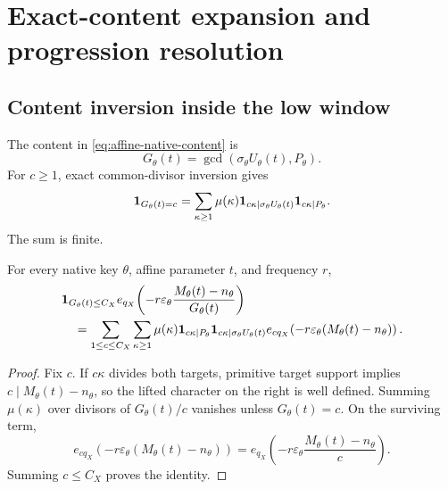 \section{Exact-content expansion and progression resolution}
\label{sec:content-progression}

\subsection{Content inversion inside the low window}

The content in \eqref{eq:affine-native-content} is
\[
 G_\theta(t)=\gcd(
 \sigma_\theta U_\theta(t),P_\theta).
\]
For \(c\ge1\), exact common-divisor inversion gives
\begin{equation}
 \mathbf 1_{G_\theta(t)=c}
 =
 \sum_{\kappa\ge1}\mu(\kappa)
 \mathbf 1_{c\kappa\mid\sigma_\theta U_\theta(t)}
 \mathbf 1_{c\kappa\mid P_\theta}.
\label{eq:content-exact-projector}
\end{equation}
The sum is finite.

\begin{lemma}
\label{lem:phase-content-inversion}
For every native key \(\theta\), affine parameter \(t\), and
frequency \(r\),
\begin{align}
 &\mathbf 1_{G_\theta(t)\le C_X}
 e_{q_X}\!\left(
 -r\varepsilon_\theta
 \frac{M_\theta(t)-n_\theta}{G_\theta(t)}\right)
\notag\\
 &\quad=
 \sum_{1\le c\le C_X}\sum_{\kappa\ge1}
 \mu(\kappa)
 \mathbf 1_{c\kappa\mid P_\theta}
 \mathbf 1_{c\kappa\mid\sigma_\theta U_\theta(t)}
 e_{cq_X}\!\left(
 -r\varepsilon_\theta
 (M_\theta(t)-n_\theta)\right).
\label{eq:phase-content-inversion}
\end{align}
\end{lemma}

\begin{proof}
Fix \(c\).  If \(c\kappa\) divides both targets, primitive target
support implies \(c\mid M_\theta(t)-n_\theta\), so the lifted
character on the right is well defined.  Summing \(\mu(\kappa)\)
over divisors of \(G_\theta(t)/c\) vanishes unless
\(G_\theta(t)=c\).  On the surviving term,
\[
 e_{cq_X}\!\left(
 -r\varepsilon_\theta(M_\theta(t)-n_\theta)\right)
 =
 e_{q_X}\!\left(
 -r\varepsilon_\theta
 \frac{M_\theta(t)-n_\theta}{c}\right).
\]
Summing \(c\le C_X\) proves the identity.
\end{proof}

